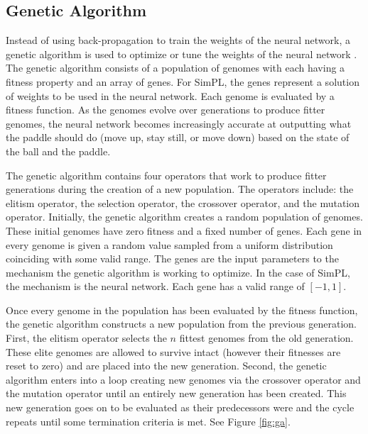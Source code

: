 \pagebreak

\subsection{Genetic Algorithm}


Instead of using back-propagation to train the weights of the neural network, a genetic algorithm is used to optimize or tune the weights of the neural network \cite{neuralnetworks}. The genetic algorithm consists of a population of genomes with each having a fitness property and an array of genes. For SimPL, the genes represent a solution of weights to be used in the neural network. Each genome is evaluated by a fitness function. As the genomes evolve over generations to produce fitter genomes, the neural network becomes increasingly accurate at outputting what the paddle should do (move up, stay still, or move down) based on the state of the ball and the paddle. 

The genetic algorithm contains four operators that work to produce fitter generations during the creation of a new population. The operators include: the elitism operator, the selection operator, the crossover operator, and the mutation operator. Initially, the genetic algorithm creates a random population of genomes. These initial genomes have zero fitness and a fixed number of genes. Each gene in every genome is given a random value sampled from a uniform distribution coinciding with some valid range. The genes are the input parameters to the mechanism the genetic algorithm is working to optimize. In the case of SimPL, the mechanism is the neural network. Each gene has a valid range of $[-1,1]$.


Once every genome in the population has been evaluated by the fitness function, the genetic algorithm constructs a new population from the previous generation. First, the elitism operator selects the $n$ fittest genomes from the old generation. These elite genomes are allowed to survive intact (however their fitnesses are reset to zero) and are placed into the new generation. Second, the genetic algorithm enters into a loop creating new genomes via the crossover operator and the mutation operator until an entirely new generation has been created. This new generation goes on to be evaluated as their predecessors were and the cycle repeats until some termination criteria is met. See Figure \ref{fig:ga}.

